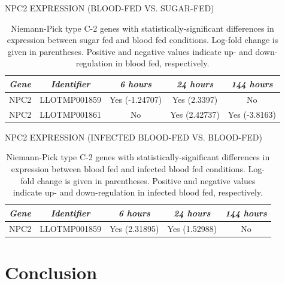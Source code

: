\begin{table}[H]
  \centering
  \caption{NPC2 EXPRESSION (BLOOD-FED VS. SUGAR-FED)}
  \begin{tabular}{ c c c c c } \hline
    \emph{Gene} & \emph{Identifier} & \emph{6 hours} & \emph{24 hours} & \emph{144 hours} \\ \hline
    NPC2 & LLOTMP001859 & Yes (-1.24707) & Yes (2.3397) & No \\
    NPC2 & LLOTMP001861 & No & Yes (2.42737) & Yes (-3.8163)
  \end{tabular}
  \caption*{Niemann-Pick type C-2 genes with statistically-significant differences in expression between sugar fed and blood fed conditions. Log-fold change is given in parentheses. Positive and negative values indicate up- and down-regulation in blood fed, respectively.}
  \label{tab:sandflies:stat-sig-npc2-sb}
\end{table}

\begin{table}[H]
  \centering
  \caption{NPC2 EXPRESSION (INFECTED BLOOD-FED VS. BLOOD-FED)}
  \begin{tabular}{ c c c c c } \hline
    \emph{Gene} & \emph{Identifier} & \emph{6 hours} & \emph{24 hours} & \emph{144 hours} \\ \hline
    NPC2 & LLOTMP001859 & Yes (2.31895) & Yes (1.52988) & No
  \end{tabular}
  \caption*{Niemann-Pick type C-2 genes with statistically-significant differences in expression between blood fed and infected blood fed conditions. Log-fold change is given in parentheses. Positive and negative values indicate up- and down-regulation in infected blood fed, respectively.}
  \label{tab:sandflies:stat-sig-npc2-bi}
\end{table}


\section{Conclusion}





